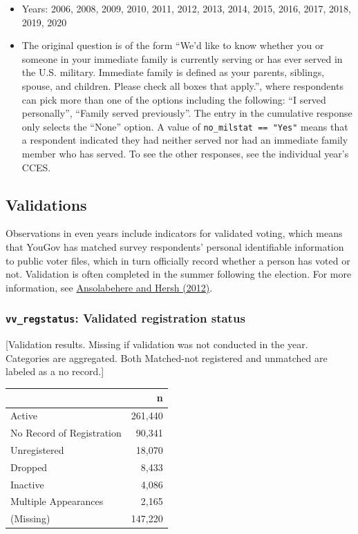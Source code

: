 \documentclass[10pt,article,oneside]{memoir}
\theoremstyle{definition}
\begin{document}
\begin{itemize}
\tightlist
\item
  Years: 2006, 2008, 2009, 2010, 2011, 2012, 2013, 2014, 2015, 2016,
  2017, 2018, 2019, 2020
\item
  The original question is of the form ``We'd like to know whether you
  or someone in your immediate family is currently serving or has ever
  served in the U.S. military. Immediate family is defined as your
  parents, siblings, spouse, and children. Please check all boxes that
  apply.'', where respondents can pick more than one of the options
  including the following: ``I served personally'', ``Family served
  previously''. The entry in the cumulative response only selects the
  ``None'' option. A value of \texttt{no\_milstat\ ==\ "Yes"} means that
  a respondent indicated they had neither served nor had an immediate
  family member who has served. To see the other responses, see the
  individual year's CCES.
\end{itemize}

\newpage

\hypertarget{validations}{%
\subsection{Validations}\label{validations}}

Observations in even years include indicators for validated voting,
which means that YouGov has matched survey respondents' personal
identifiable information to public voter files, which in turn officially
record whether a person has voted or not. Validation is often completed
in the summer following the election. For more information, see
\href{https://doi.org/10.1093/pan/mps023}{Ansolabehere and Hersh
(2012)}.

\hypertarget{vv_regstatus-validated-registration-status}{%
\subsubsection{\texorpdfstring{\texttt{vv\_regstatus}: Validated
registration
status}{vv\_regstatus: Validated registration status}}\label{vv_regstatus-validated-registration-status}}

{[}Validation results. Missing if validation was not conducted in the
year. Categories are aggregated. Both Matched-not registered and
unmatched are labeled as a no record.{]}

\begin{table}[H]
\centering
\begin{tabular}[t]{lr}
\toprule
 & n\\
\midrule
Active & 261,440\\
No Record of Registration & 90,341\\
Unregistered & 18,070\\
Dropped & 8,433\\
Inactive & 4,086\\
Multiple Appearances & 2,165\\
(Missing) & 147,220\\
\bottomrule
\end{tabular}
\end{table}
\end{document}
